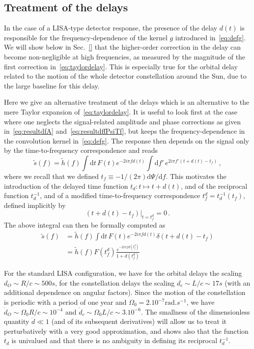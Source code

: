 \documentclass[aps,showpacs,twocolumn,
prd,superscriptaddress,nofootinbib]{revtex4-1}
\newcommand{\be}{\begin{equation}}
\newcommand{\ee}{\end{equation}}
\newcommand\ud{{\mathrm{d}}}
\newcommand{\nn}{\nonumber}
\newcommand{\tf}{t_{f}}
\newcommand{\tfd}{t_{f}^{d}}
\begin{document}

\subsection{Treatment of the delays}
\label{subsec:delays}

In the case of a LISA-type detector response, the presence of the delay $d(t)$ is responsible for the frequency-dependence of the kernel $g$ introduced in~\eqref{eq:defg}. We will show below in Sec.~\ref{} that the higher-order correction in the delay can become non-negligible at high frequencies, as measured by the magnitude of the first correction in~\eqref{eq:taylordelay}. This is especially true for the orbital delay related to the motion of the whole detector constellation around the Sun, due to the large baseline for this delay.

Here we give an alternative treatment of the delays which is an alternative to the mere Taylor expansion of~\eqref{eq:taylordelay}. It is useful to look first at the case where one neglects the signal-related amplitude and phase corrections as given in~\eqref{eq:resultdfA} and~\eqref{eq:resultdffPsiTf}, but keeps the frequency-dependence in the convolution kernel in~\eqref{eq:defg}. The response then depends on the signal only by the time-to-frequency correspondence and reads
\begin{equation}
	\tilde{s}(f) = \tilde{h}(f) \int \ud t \, F(t) e^{-2i\pi f d(t)} \int \ud f' \, e^{2i\pi f' (t+d(t) - t_{f})} \,,
\end{equation}
where we recall that we defined $t_{f} \equiv -1/(2\pi)\ud \Psi/\ud f$. This motivates the introduction of the delayed time function $t_{d}:t \mapsto t+d(t)$, and of the reciprocal function $t_{d}^{-1}$, and of a modified time-to-frequency correspondence $\tfd = t_{d}^{-1}(\tf)$, defined implicitly by
\be
	\left. (t + d(t) - t_{f})\right|_{t=t_{f}^{d}} = 0 \,.
\ee
The above integral can then be formally computed as
\begin{align}\label{eq:delaycorrleading}
	\tilde{s}(f) &= \tilde{h}(f) \int \ud t \, F(t) e^{-2i\pi f d(t)} \delta(t + d(t) - t_{f}) \nn \\
	&= \tilde{h}(f) F(t_{f}^{d}) \frac{e^{-2i\pi f d(t_{f}^{d})}}{1+\dot{d}(t_{f}^{d})}
\end{align}

For the standard LISA configuration, we have for the orbital delays the scaling $d_{O}\sim R/c \sim 500s$, for the constellation delays the scaling $d_{c}\sim L/c \sim 17s$ (with an additional dependence on angular factors). Since the motion of the constellation is periodic with a period of one year and $\Omega_{0} = 2.10^{-7}\mathrm{rad}.s^{-1}$, we have $\dot{d}_{O} \sim \Omega_{0} R/c \sim 10^{-4}$ and $\dot{d}_{c} \sim \Omega_{0} L/c \sim 3.10^{-6}$. The smallness of the dimensionless quantity $\dot{d} \ll 1$ (and of its subsequent derivatives) will allow us to treat it perturbatively with a very good approximation, and shows also that the function $t_{d}$ is univalued and that there is no ambiguity in defining its reciprocal $t_{d}^{-1}$.
\end{document}
